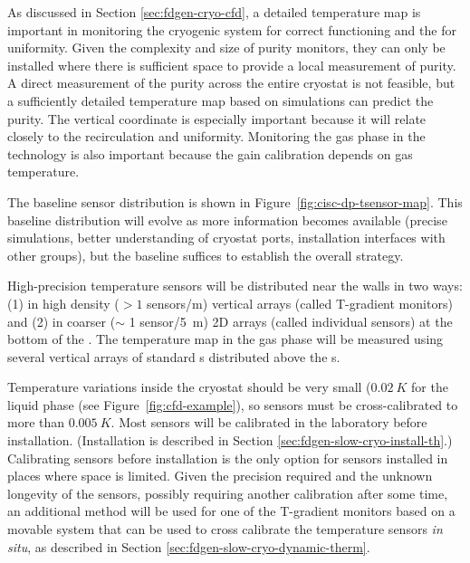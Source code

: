 
As discussed in Section \ref{sec:fdgen-cryo-cfd}, a detailed \threed temperature map is important %
in monitoring %
the cryogenic system for correct functioning and the \lar for uniformity.
Given the complexity and size of purity monitors, they can only be installed where there is sufficient space to provide a local measurement of
\lar purity. 
A direct measurement of the  purity across the entire cryostat is not feasible, but a sufficiently detailed \threed temperature map based on  simulations can predict the purity. The vertical coordinate is especially important because it will relate closely to the 
 recirculation and uniformity. Monitoring the gas phase in the  technology is also important because the  gain calibration depends on gas temperature. 

 
The baseline sensor distribution 
is shown in Figure~\ref{fig:cisc-dp-tsensor-map}. This baseline distribution will evolve as more information becomes available (precise  simulations, better understanding of cryostat ports, installation interfaces with other groups), but the baseline suffices to establish the overall strategy.




High-precision temperature sensors will be distributed near the   walls in two ways:
(1) in high density (\(>1\) sensors/\si{m}) vertical arrays %
(called T-gradient monitors) and (2) in coarser ($\sim$ 1 sensor/\SI{5}{m}) 2D arrays %
(called individual sensors) at the bottom of the .
The temperature map in the gas phase will be measured using several vertical arrays of standard s distributed above the s.  



Temperature variations inside the cryostat should be very small ($\SI{0.02}{K}$ for the liquid phase (see Figure~\ref{fig:cfd-example}),
so sensors must be cross-calibrated to more than $\SI{0.005}{K}$. Most sensors will be calibrated in the laboratory before installation.
(Installation is described in Section \ref{sec:fdgen-slow-cryo-install-th}.)
Calibrating sensors before installation is the only option for sensors installed in places where space is limited. 
Given the precision required and the unknown longevity of the sensors, possibly requiring another  calibration after some time, an additional method
will be used for one of the T-gradient monitors based on a movable system that can be used to cross calibrate
the temperature sensors {\em in situ}, as described in Section \ref{sec:fdgen-slow-cryo-dynamic-therm}.

